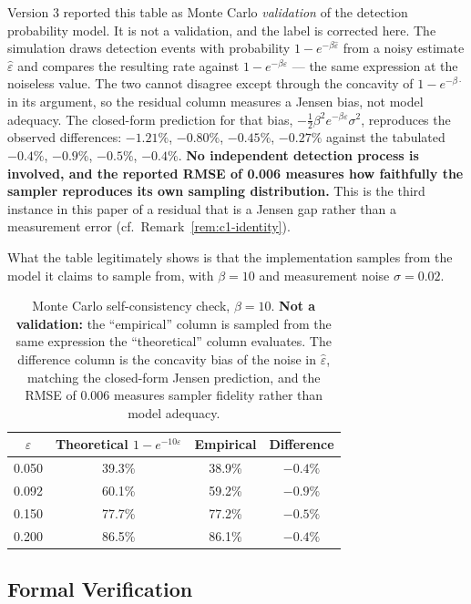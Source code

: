 \documentclass[11pt,a4paper]{article}
\theoremstyle{definition}
\theoremstyle{remark}
\begin{document}
Version 3 reported this table as Monte Carlo \emph{validation} of the detection probability
model. It is not a validation, and the label is corrected here. The simulation draws detection
events with probability $1 - e^{-\beta\hat\varepsilon}$ from a noisy estimate $\hat\varepsilon$
and compares the resulting rate against $1 - e^{-\beta\varepsilon}$ --- the same expression at
the noiseless value. The two cannot disagree except through the concavity of $1-e^{-\beta\cdot}$
in its argument, so the residual column measures a Jensen bias, not model adequacy. The
closed-form prediction for that bias, $-\tfrac{1}{2}\beta^2 e^{-\beta\varepsilon}\sigma^2$,
reproduces the observed differences: $-1.21\%$, $-0.80\%$, $-0.45\%$, $-0.27\%$ against the
tabulated $-0.4\%$, $-0.9\%$, $-0.5\%$, $-0.4\%$. \textbf{No independent detection process is
involved, and the reported RMSE of 0.006 measures how faithfully the sampler reproduces its own
sampling distribution.} This is the third instance in this paper of a residual that is a Jensen
gap rather than a measurement error (cf.\ Remark~\ref{rem:c1-identity}).

What the table legitimately shows is that the implementation samples from the model it claims
to sample from, with $\beta = 10$ and measurement noise $\sigma = 0.02$.

\begin{table}[H]
\centering
\begin{tabular}{cccc}
\toprule
$\varepsilon$ & \textbf{Theoretical $1-e^{-10\varepsilon}$} & \textbf{Empirical} & \textbf{Difference} \\
\midrule
0.050 & 39.3\% & 38.9\% & $-0.4\%$ \\
0.092 & 60.1\% & 59.2\% & $-0.9\%$ \\
0.150 & 77.7\% & 77.2\% & $-0.5\%$ \\
0.200 & 86.5\% & 86.1\% & $-0.4\%$ \\
\bottomrule
\end{tabular}
\caption{Monte Carlo self-consistency check, $\beta=10$. \textbf{Not a validation:} the ``empirical'' column is sampled from the same expression the ``theoretical'' column evaluates. The difference column is the concavity bias of the noise in $\hat\varepsilon$, matching the closed-form Jensen prediction, and the RMSE of 0.006 measures sampler fidelity rather than model adequacy.}
\end{table}

\subsection{Formal Verification}
\label{sec:formal-verification}
\end{document}
